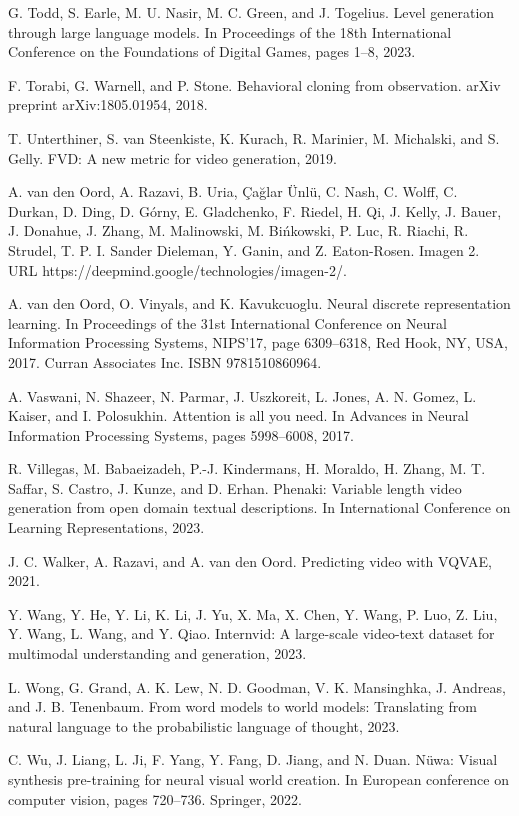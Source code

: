 \documentclass[10pt]{article}
\begin{document}
G. Todd, S. Earle, M. U. Nasir, M. C. Green, and J. Togelius. Level generation through large language models. In Proceedings of the 18th International Conference on the Foundations of Digital Games, pages 1–8, 2023.

F. Torabi, G. Warnell, and P. Stone. Behavioral cloning from observation. arXiv preprint arXiv:1805.01954, 2018.

T. Unterthiner, S. van Steenkiste, K. Kurach, R. Marinier, M. Michalski, and S. Gelly. FVD: A new metric for video generation, 2019.

A. van den Oord, A. Razavi, B. Uria, Çağlar Ünlü, C. Nash, C. Wolff, C. Durkan, D. Ding, D. Górny, E. Gladchenko, F. Riedel, H. Qi, J. Kelly, J. Bauer, J. Donahue, J. Zhang, M. Malinowski, M. Bińkowski, P. Luc, R. Riachi, R. Strudel, T. P. I. Sander Dieleman, Y. Ganin, and Z. Eaton-Rosen. Imagen 2. URL https://deepmind.google/technologies/imagen-2/.

A. van den Oord, O. Vinyals, and K. Kavukcuoglu. Neural discrete representation learning. In Proceedings of the 31st International Conference on Neural Information Processing Systems, NIPS’17, page 6309–6318, Red Hook, NY, USA, 2017. Curran Associates Inc. ISBN 9781510860964.

A. Vaswani, N. Shazeer, N. Parmar, J. Uszkoreit, L. Jones, A. N. Gomez, L. Kaiser, and I. Polosukhin. Attention is all you need. In Advances in Neural Information Processing Systems, pages 5998–6008, 2017.

R. Villegas, M. Babaeizadeh, P.-J. Kindermans, H. Moraldo, H. Zhang, M. T. Saffar, S. Castro, J. Kunze, and D. Erhan. Phenaki: Variable length video generation from open domain textual descriptions. In International Conference on Learning Representations, 2023.

J. C. Walker, A. Razavi, and A. van den Oord. Predicting video with VQVAE, 2021.

Y. Wang, Y. He, Y. Li, K. Li, J. Yu, X. Ma, X. Chen, Y. Wang, P. Luo, Z. Liu, Y. Wang, L. Wang, and Y. Qiao. Internvid: A large-scale video-text dataset for multimodal understanding and generation, 2023.

L. Wong, G. Grand, A. K. Lew, N. D. Goodman, V. K. Mansinghka, J. Andreas, and J. B. Tenenbaum. From word models to world models: Translating from natural language to the probabilistic language of thought, 2023.

C. Wu, J. Liang, L. Ji, F. Yang, Y. Fang, D. Jiang, and N. Duan. Nüwa: Visual synthesis pre-training for neural visual world creation. In European conference on computer vision, pages 720–736. Springer, 2022.
\end{document}
